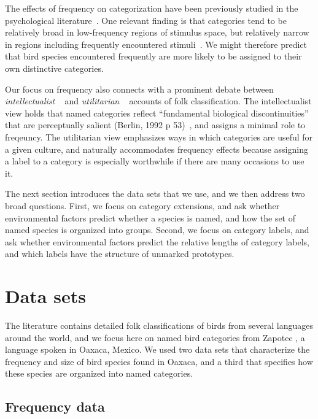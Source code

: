 \documentclass[10pt,letterpaper]{article}
\begin{document}
The effects of frequency on categorization have been previously studied in the psychological literature~\cite{parducci83,nosofsky88,barsalouhl98}.  One relevant finding is that categories tend to be relatively broad in low-frequency regions of stimulus space, but relatively narrow in regions including frequently encountered stimuli~\cite{parducci83}. We might therefore predict that bird species encountered frequently are more likely to be assigned to their own distinctive categories.  

Our focus on frequency also connects with a prominent debate between \emph{intellectualist} ~\cite{berlin2014ethnobiological} and \emph{utilitarian} ~\cite{hunn1982utilitarian} accounts of folk classification. The intellectualist view holds that named categories reflect ``fundamental biological discontinuities'' that are perceptually salient (Berlin, 1992 p 53)~\nocite{berlin2014ethnobiological}, and assigns a minimal role to freqeuncy. The utilitarian view emphasizes ways in which categories are useful for a given culture, and naturally accommodates frequency effects because assigning a label to a category is especially worthwhile if there are many occasions to use it.

The next section introduces the data sets that we use, and we then address two broad questions. First, we focus on category extensions, and ask whether environmental factors predict whether a species is named, and how the set of named species is organized into groups. Second, we focus on category labels, and ask whether environmental factors predict the relative lengths of category labels, and which labels have the structure of unmarked prototypes. 


\section{Data sets}

The literature contains detailed folk classifications of birds from several languages around the world, and we focus here on named bird categories from Zapotec \cite{hunn2008zapotec}, a language spoken in Oaxaca, Mexico.  We used two data sets that characterize the frequency and size of bird species found in Oaxaca, and a third that specifies how these species are organized into named categories.

\subsection{Frequency data}
\end{document}
